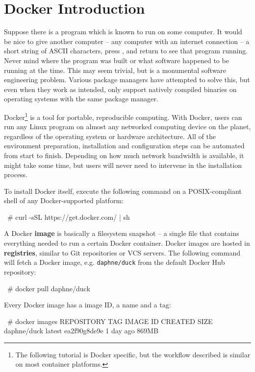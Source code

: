 \documentclass[12pt,initial,twoside,maitrise]{dms}
\def\inline{\lstinline[basicstyle=\ttfamily]}
\numberwithin{equation}{section}
\numberwithin{table}{chapter}
\numberwithin{figure}{chapter}
\begin{document}
\section{Docker Introduction}

Suppose there is a program which is known to run on some computer. It would be nice to give another computer -- any computer with an internet connection -- a short string of ASCII characters, press \keys{\return}, and return to see that program running. Never mind where the program was built or what software happened to be running at the time. This may seem trivial, but is a monumental software engineering problem. Various package managers have attempted to solve this, but even when they work as intended, only support natively compiled binaries on operating systems with the same package manager.

Docker\footnote{The following tutorial is Docker specific, but the workflow described is similar on most container platforms.} is a tool for portable, reproducible computing. With Docker, users can run any Linux program on almost any networked computing device on the planet, regardless of the operating system or hardware architecture. All of the environment preparation, installation and configuration steps can be automated from start to finish. Depending on how much network bandwidth is available, it might take some time, but users will never need to intervene in the installation process.

To install Docker itself, execute the following command on a POSIX-compliant shell of any Docker-supported platform:

\begin{pclisting}
~# curl -sSL https://get.docker.com/ | sh
\end{pclisting}

A Docker \textbf{image} is basically a filesystem snapshot -- a single file that contains everything needed to run a certain Docker container. Docker images are hosted in \textbf{registries}, similar to Git repositories or VCS servers. The following command will fetch a Docker image, e.g. \inline{daphne/duck} from the default Docker Hub repository:

\begin{pclisting}
~# docker pull daphne/duck
\end{pclisting}

Every Docker image has a image ID, a name and a tag:

\begin{pclisting}
~# docker images
REPOSITORY      TAG        IMAGE ID         CREATED       SIZE
daphne/duck     latest     ea2f90g8de9e     1 day ago     869MB
\end{pclisting}
\end{document}

